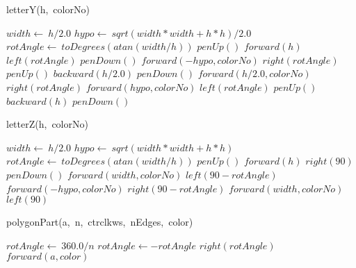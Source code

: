 \documentclass[a4paper,10pt]{article}
\begin{document}
\begin{algorithm}
\caption{letterY(h,\ colorNo)}
\begin{algorithmic}[5]

\STATE {}
\STATE {}
  \STATE \(width\gets\ h/2.0\)
  \STATE \(hypo\gets\ sqrt(width*width+h*h)/2.0\)
  \STATE \(rotAngle\gets\ toDegrees(atan(width/h))\)
  \STATE \(penUp()\)
  \STATE \(forward(h)\)
  \STATE \(left(rotAngle)\)
  \STATE \(penDown()\)
  \STATE \(forward(-hypo,colorNo)\)
  \STATE \(right(rotAngle)\)
  \STATE \(penUp()\)
  \STATE \(backward(h/2.0)\)
  \STATE \(penDown()\)
  \STATE \(forward(h/2.0,colorNo)\)
  \STATE \(right(rotAngle)\)
  \STATE \(forward(hypo,colorNo)\)
  \STATE \(left(rotAngle)\)
  \STATE \(penUp()\)
  \STATE \(backward(h)\)
  \STATE \(penDown()\)

\end{algorithmic}
\end{algorithm}


\begin{algorithm}
\caption{letterZ(h,\ colorNo)}
\begin{algorithmic}[5]

\STATE {}
\STATE {}
  \STATE \(width\gets\ h/2.0\)
  \STATE \(hypo\gets\ sqrt(width*width+h*h)\)
  \STATE \(rotAngle\gets\ toDegrees(atan(width/h))\)
  \STATE \(penUp()\)
  \STATE \(forward(h)\)
  \STATE \(right(90)\)
  \STATE \(penDown()\)
  \STATE \(forward(width,colorNo)\)
  \STATE \(left(90-rotAngle)\)
  \STATE \(forward(-hypo,colorNo)\)
  \STATE \(right(90-rotAngle)\)
  \STATE \(forward(width,colorNo)\)
  \STATE \(left(90)\)

\end{algorithmic}
\end{algorithm}


\begin{algorithm}
\caption{polygonPart(a,\ n,\ ctrclkws,\ nEdges,\ color)}
\begin{algorithmic}[5]

\STATE {}
\STATE {}
  \STATE \(rotAngle\gets\ 360.0/n\)
    \STATE \(rotAngle\gets-rotAngle\)
  \ENDIF
    \STATE \(right(rotAngle)\)
    \STATE \(forward(a,color)\)
  \ENDFOR

\end{algorithmic}
\end{algorithm}
\end{document}

